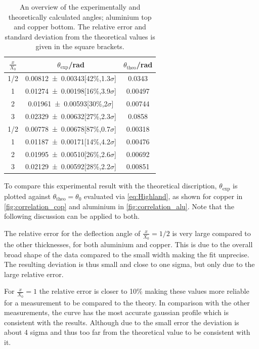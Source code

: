 \documentclass[sn-mathphys-num,iicol]{sn-jnl}
\theoremstyle{thmstyleone}
\theoremstyle{thmstyletwo}
\theoremstyle{thmstylethree}
\begin{document}
\begin{table}
  \begin{tabular}{ccc}
    \toprule
    $\tfrac{x}{X_0}$ & $\theta _\text{exp}$/rad & $\theta _\text{theo}$/rad \\
    \midrule
    1/2 & \num{.00812+-.00343}[42\%,1.3$\sigma$] & 0.0343\\
    1 & \num{.01274+-.00198}[16\%,3.9$\sigma$] & 0.00497\\
    2 & \num{.01961+-.00593}[30\%,2$\sigma$] & 0.00744\\
    3 & \num{.02329+-.00632}[27\%,2.3$\sigma$] & 0.0858\\
    \midrule
    1/2 & \num{.00778+-.00678}[87\%,0.7$\sigma$] & 0.00318\\
    1 & \num{.01187+-.00171}[14\%,4.2$\sigma$] & 0.00476\\
    2 & \num{.01995+-.00510}[26\%,2.6$\sigma$] & 0.00692\\
    3 & \num{.02129+-.00592}[28\%,2.2$\sigma$] & 0.00851\\
    \bottomrule
  \end{tabular}
  \caption{An overview of the experimentally and theoretically calculated angles; aluminium top and copper bottom. 
  The relative error and standard deviation from the theoretical values is given in the square brackets.}
\end{table}
To compare this experimental result with the theoretical discription, $\theta_\text{exp}$ is plotted against $\theta_\text{theo} = \theta_0$ evaluated via \autoref{eq:Highland}, as shown for copper in \autoref{fig:correlation_cop} and aluminium in \autoref{fig:correlation_alu}.
Note that the following discussion can be applied to both.

The relative error for the deflection angle of $\tfrac{x}{X_0}=1/2$ is very large compared to the other thicknesses, for both aluminium and copper.
This is due to the overall broad shape of the data compared to the small width making the fit unprecise.
The resulting deviation is thus small and close to one sigma, but only due to the large relative error.

For $\tfrac{x}{X_0}=1$ the relative error is closer to 10\% making these values more reliable for a measurement to be compared to the theory.
In comparison with the other measurements, the curve has the most accurate gaussian profile which is consistent with the results.
Although due to the small error the deviation is about 4 sigma and thus too far from the theoretical value to be consistent with it.
\end{document}
